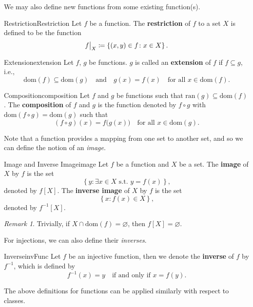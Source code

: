 \documentclass[math]{amznotes}
\theoremstyle{remark}
\newtheorem*{remark}{Remark}
\begin{document}
We may also define new functions from some existing function(s).
\begin{dfnbox}{Restriction}{Restriction}
    Let $f$ be a function. The {\color{red} \textbf{restriction}} of $f$ to a set $X$ is defined to be the function  
    \begin{displaymath}
        \restrict{f}{X} \coloneqq \left\{(x, y) \in f \colon x \in X\right\}.
    \end{displaymath}
\end{dfnbox}
\begin{dfnbox}{Extension}{extension}
    Let $f$, $g$ be functions. $g$ is called an {\color{red} \textbf{extension}} of $f$ if $f \subseteq g$, i.e.,
    \begin{displaymath}
        \mathrm{dom}(f) \subseteq \mathrm{dom}(g) \quad \textrm{and} \quad g(x) = f(x) \quad \textrm{for all } x \in \mathrm{dom}(f).
    \end{displaymath}
\end{dfnbox}
\begin{dfnbox}{Composition}{composition}
    Let $f$ and $g$ be functions such that $\mathrm{ran}(g) \subseteq \mathrm{dom}(f)$. The {\color{red} \textbf{composition}} of $f$ and $g$ is the function denoted by $f \circ g$ with $\mathrm{dom}(f \circ g) = \mathrm{dom}(g)$ such that
    \begin{displaymath}
        (f \circ g)(x) = f\bigl(g(x)\bigr) \quad \textrm{for all } x \in \mathrm{dom}(g).
    \end{displaymath}
\end{dfnbox}
Note that a function provides a mapping from one set to another set, and so we can define the notion of an \textit{image}.
\begin{dfnbox}{Image and Inverse Image}{image}
    Let $f$ be a function and $X$ be a set. The {\color{red} \textbf{image}} of $X$ by $f$ is the set
    \begin{displaymath}
        \left\{y \colon \exists x \in X \textrm{ s.t. } y = f(x)\right\},
    \end{displaymath}
    denoted by $f[X]$. The {\color{red} \textbf{inverse image}} of $X$ by $f$ is the set
    \begin{displaymath}
        \left\{x \colon f(x) \in X\right\},
    \end{displaymath}
    denoted by $f^{-1}[X]$.
\end{dfnbox}
\begin{notebox}
    \begin{remark}
        Trivially, if $X \cap \mathrm{dom}(f) = \varnothing$, then $f[X] = \varnothing$.
    \end{remark}
\end{notebox}
For injections, we can also define their \textit{inverses}.
\begin{dfnbox}{Inverse}{invFunc}
    Let $f$ be an injective function, then we denote the {\color{red} \textbf{inverse}} of $f$ by $f^{-1}$, which is defined by
    \begin{displaymath}
        f^{-1}(x) = y \quad \textrm{if and only if } x = f(y). 
    \end{displaymath}
\end{dfnbox}
The above definitions for functions can be applied similarly with respect to classes.
\end{document}
